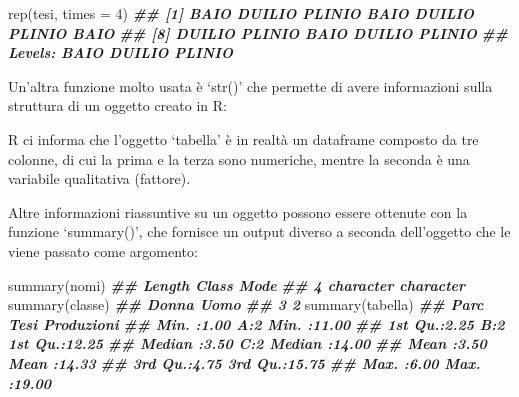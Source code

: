 \documentclass[
  12pt,
]{book}
\newenvironment{Shaded}{\begin{snugshade}}{\end{snugshade}}
\newcommand{\AttributeTok}[1]{\textcolor[rgb]{0.77,0.63,0.00}{#1}}
\newcommand{\DecValTok}[1]{\textcolor[rgb]{0.00,0.00,0.81}{#1}}
\newcommand{\DocumentationTok}[1]{\textcolor[rgb]{0.56,0.35,0.01}{\textbf{\textit{#1}}}}
\newcommand{\FunctionTok}[1]{\textcolor[rgb]{0.00,0.00,0.00}{#1}}
\newcommand{\NormalTok}[1]{#1}
\begin{document}
\begin{Shaded}
\begin{Highlighting}[]
\FunctionTok{rep}\NormalTok{(tesi, }\AttributeTok{times =} \DecValTok{4}\NormalTok{)}
\DocumentationTok{\#\#  [1] BAIO   DUILIO PLINIO BAIO   DUILIO PLINIO BAIO  }
\DocumentationTok{\#\#  [8] DUILIO PLINIO BAIO   DUILIO PLINIO}
\DocumentationTok{\#\# Levels: BAIO DUILIO PLINIO}
\end{Highlighting}
\end{Shaded}

Un'altra funzione molto usata è `str()' che permette di avere informazioni sulla struttura di un oggetto creato in R:

\begin{Shaded}
\end{Shaded}

R ci informa che l'oggetto `tabella' è in realtà un dataframe composto da tre colonne, di cui la prima e la terza sono numeriche, mentre la seconda è una variabile qualitativa (fattore).

Altre informazioni riassuntive su un oggetto possono essere ottenute con la funzione `summary()', che fornisce un output diverso a seconda dell'oggetto che le viene passato come argomento:

\begin{Shaded}
\begin{Highlighting}[]
\FunctionTok{summary}\NormalTok{(nomi)}
\DocumentationTok{\#\#    Length     Class      Mode }
\DocumentationTok{\#\#         4 character character}
\FunctionTok{summary}\NormalTok{(classe)}
\DocumentationTok{\#\# Donna  Uomo }
\DocumentationTok{\#\#     3     2}
\FunctionTok{summary}\NormalTok{(tabella)}
\DocumentationTok{\#\#       Parc      Tesi    Produzioni   }
\DocumentationTok{\#\#  Min.   :1.00   A:2   Min.   :11.00  }
\DocumentationTok{\#\#  1st Qu.:2.25   B:2   1st Qu.:12.25  }
\DocumentationTok{\#\#  Median :3.50   C:2   Median :14.00  }
\DocumentationTok{\#\#  Mean   :3.50         Mean   :14.33  }
\DocumentationTok{\#\#  3rd Qu.:4.75         3rd Qu.:15.75  }
\DocumentationTok{\#\#  Max.   :6.00         Max.   :19.00}
\end{Highlighting}
\end{Shaded}
\end{document}
